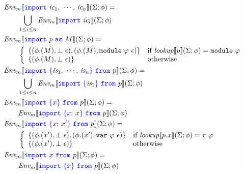 \documentclass[a4paper]{article}
\newcommand{\Env}{\emph{Env}}
\newcommand{\var}{{\tt{var}}}
\newcommand{\module}{{\tt{module}}}
\newcommand{\code}[1]{\textcolor{blue}{\tt #1}}
\newcommand{\If}{\mbox{if}}
\newcommand{\Otherwise}{\mbox{otherwise}}
\newcommand{\lookup}{\emph{lookup}}
\begin{document}
\begin{equation*}
\begin{split}
&\Env_m \llbracket \code{import}\ \emph{ic}_1\code{,}\ \cdots\code{,}\ \emph{ic}_n \rrbracket (\Sigma; \phi) = \\
&\qquad\bigcup_{1 \le i \le n} \Env_m \llbracket \code{import}\ \emph{ic}_i \rrbracket (\Sigma; \phi) \\
&\Env_m \llbracket \code{import}\ p\ \code{as}\ M \rrbracket (\Sigma; \phi) = \\
&\qquad\left\{\begin{array}{ll}
\{(\phi.(M), \bot\ \epsilon), (\phi.(M), \module\ \varphi\ \epsilon)\} & \If\ \lookup \llbracket p \rrbracket (\Sigma; \phi) = \module\ \varphi \\
\{(\phi.(M), \bot\ \epsilon)\} & \Otherwise
\end{array}\right. \\
&\Env_m \llbracket \code{import}\ \code{\{} \emph{is}_1\code{,}\ \cdots\code{,}\ \emph{is}_n \code{\}}\ \code{from}\ p \rrbracket (\Sigma; \phi) = \\
&\qquad\bigcup_{1 \le i \le n} \Env_m \llbracket \code{import}\ \code{\{} \emph{is}_1 \code{\}}\ \code{from}\ p \rrbracket (\Sigma; \phi) \\
&\Env_m \llbracket \code{import}\ \code{\{} x \code{\}}\ \code{from}\ p \rrbracket (\Sigma; \phi) = \\
&\qquad\Env_m \llbracket \code{import}\ \code{\{} x\code{:}\ x \code{\}}\ \code{from}\ p \rrbracket (\Sigma; \phi) \\
&\Env_m \llbracket \code{import}\ \code{\{} x\code{:}\ x' \code{\}}\ \code{from}\ p \rrbracket (\Sigma; \phi) = \\
&\qquad\left\{\begin{array}{ll}
\{(\phi.(x'), \bot\ \epsilon), (\phi.(x'), \var\ \varphi\ \epsilon)\} & \If\ \lookup \llbracket p.x \rrbracket (\Sigma; \phi) = \tau\ \varphi \\
\{(\phi.(x'), \bot\ \epsilon)\} & \Otherwise
\end{array}\right. \\
&\Env_m \llbracket \code{import}\ x\ \code{from}\ p \rrbracket (\Sigma; \phi) = \\
&\qquad\Env_m \llbracket \code{import}\ \code{\{} x \code{\}}\ \code{from}\ p \rrbracket (\Sigma; \phi) \\
\end{split}
\end{equation*}
\end{document}
